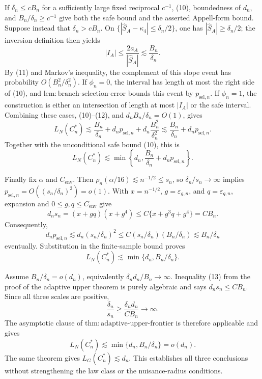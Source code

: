 If \(\delta_n\le cB_n\) for a sufficiently large fixed reciprocal \(c^{-1}\), (10), boundedness of \(d_n\), and \(B_n/\delta_n\ge c^{-1}\) give both the safe bound and the asserted Appell-form bound.  Suppose instead that \(\delta_n>cB_n\).  On \(\{|\widehat S_A-\kappa_4|\le\delta_n/2\}\), one has \(|\widehat S_A|\ge\delta_n/2\); the inversion definition then yields
\[
|I_A|\le\frac{2a_A}{|\widehat S_A|}\lesssim\frac{B_n}{\delta_n}.
\tag{12}
\]
By (11) and Markov's inequality, the complement of this slope event has probability \(O(B_n^2/\delta_n^2)\).  If \(\phi_n=0\), the interval has length at most the right side of (10), and \(\mathrm{lem:branch\mbox{-}selection\mbox{-}error}\) bounds this event by \(p_{\mathrm{sel},n}\).  If \(\phi_n=1\), the construction is either an intersection of length at most \(|I_A|\) or the safe interval.  Combining these cases, (10)--(12), and \(d_nB_n/\delta_n=O(1)\), gives
\[
L_N(C_n^*)
\lesssim \frac{B_n}{\delta_n}+d_np_{\mathrm{sel},n}
+d_n\frac{B_n^2}{\delta_n^2}
\lesssim \frac{B_n}{\delta_n}+d_np_{\mathrm{sel},n}.
\]
Together with the unconditional safe bound (10), this is
\[
L_N(C_n^*)\lesssim
\min\left\{d_n,\frac{B_n}{\delta_n}+d_np_{\mathrm{sel},n}\right\}.
\]

Finally fix \(\alpha\) and \(C_{\mathrm{env}}\).  Then \(\rho_n(\alpha/16)\lesssim n^{-1/2}\le s_n\), so \(\delta_n/s_n\to\infty\) implies \(p_{\mathrm{sel},n}=O((s_n/\delta_n)^2)=o(1)\).  With \(x=n^{-1/2}\), \(g=\varepsilon_{g,n}\), and \(q=\varepsilon_{q,n}\), expansion and \(0\le g,q\le C_{\mathrm{env}}\) give
\[
d_ns_n=(x+gq)(x+g^4)
\le C\{x+g^3q+g^4\}=CB_n.
\tag{13}
\]
Consequently,
\[
d_np_{\mathrm{sel},n}
\lesssim d_n(s_n/\delta_n)^2
\le C(s_n/\delta_n)(B_n/\delta_n)
\lesssim B_n/\delta_n
\]
eventually.  Substitution in the finite-sample bound proves
\[
L_N(C_n^*)\lesssim\min\{d_n,B_n/\delta_n\}.
\]

Assume \(B_n/\delta_n=o(d_n)\), equivalently \(\delta_nd_n/B_n\to\infty\).  Inequality (13) from the proof of the adaptive upper theorem is purely algebraic and says \(d_ns_n\le CB_n\).  Since all three scales are positive,
\[
\frac{\delta_n}{s_n}
\ge\frac{\delta_nd_n}{CB_n}\longrightarrow\infty.
\]
The asymptotic clause of \(\mathrm{thm:adaptive\mbox{-}upper\mbox{-}frontier}\) is therefore applicable and gives
\[
L_N(C_n^*)\lesssim\min\{d_n,B_n/\delta_n\}=o(d_n).
\]
The same theorem gives \(L_G(C_n^*)\lesssim d_n\).  This establishes all three conclusions without strengthening the law class or the nuisance-radius conditions.

